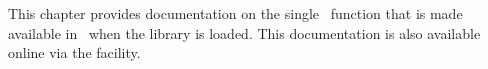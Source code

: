 This chapter provides documentation on the single \ML\ function that is made
available in \HOL\ when the  library is loaded.  This documentation
is also available online via the  facility.


